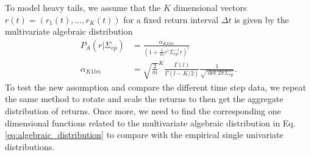 To model heavy tails, we assume that the $K$ dimensional vectors
$r \left( t \right) = \left( r_{1} \left( t \right), \ldots, r_{K} \left( t \right) \right)$
for a fixed return interval $\Delta t$ is given by the multivariate algebraic
distribution
\begin{align}
    P_{A} \left( r | \Sigma_{ep} \right) &= \frac{\alpha_{K1lm}}{\left( 1 + \frac{1}{m} r^{\dagger} \Sigma^{-1}_{ep} r \right)^{l}}\label{eq:algebraic_distribution} \\
    \alpha_{K1lm} &= {\sqrt{\frac{2}{m}}}^{K} \frac{\Gamma \left( l \right)}{\Gamma \left( l - K/2 \right)} \frac{1}{\sqrt{\det 2 \pi \Sigma_{ep}}}.
\end{align}
To test the new assumption and compare the different time step data, we
repeat the same method to rotate and scale the returns to then get the
aggregate distribution of returns. Once more, we need to find the
corresponding one dimensional functions related to the multivariate algebraic
distribution in Eq. \ref{eq:algebraic_distribution} to compare with the
empirical single univariate distributions.

